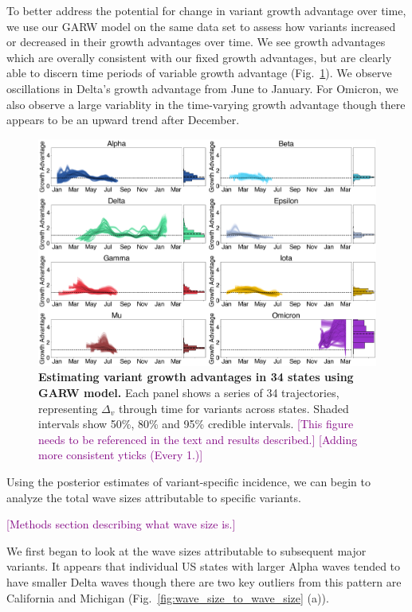 \documentclass[11pt,oneside,letterpaper]{article}
\def\tbc#1{\textcolor{purple}{[#1]}}
\begin{document}
To better address the potential for change in variant growth advantage over time, we use our GARW model on the same data set to assess how variants increased or decreased in their growth advantages over time. 
We see growth advantages which are overally consistent with our fixed growth advantages, but are clearly able to discern time periods of variable growth advantage (Fig.\ \ref{fig:ga_consensus}).
We observe oscillations in Delta's growth advantage from June to January.
For Omicron, we also observe a large variablity in the time-varying growth advantage though there appears to be an upward trend after December.

\begin{figure}[t]
  \centering
  \includegraphics[width=\linewidth]{figs/ga_consensus.png}
  \caption{\textbf{Estimating variant growth advantages in 34 states using GARW model.}
  Each panel shows a series of 34 trajectories, representing $\Delta_{v}$ through time for variants across states. %
  Shaded intervals show 50\%, 80\% and 95\% credible intervals.
  \tbc{This figure needs to be referenced in the text and results described.}
  \tbc{Adding more consistent yticks (Every 1.)}
  }
  \label{fig:ga_consensus}
\end{figure}

Using the posterior estimates of variant-specific incidence, we can begin to analyze the total wave sizes attributable to specific variants.

\tbc{Methods section describing what wave size is.}

We first began to look at the wave sizes attributable to subsequent major variants.
It appears that individual US states with larger Alpha waves tended to have smaller Delta waves though there are two key outliers from this pattern are California and Michigan (Fig.\ \ref{fig:wave_size_to_wave_size} (a)).
\end{document}
